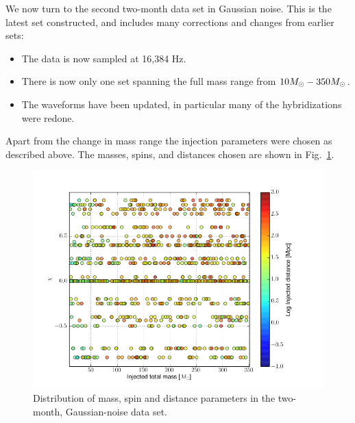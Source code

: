 We now turn to the second two-month data set in Gaussian noise.  This
is the latest set constructed, and includes many corrections and
changes from earlier sets:

\begin{itemize}
\item The data is now sampled at 16,384 Hz.
\item There is now only one set spanning the full mass range from $10
M_\odot - 350 M_\odot$.
\item The waveforms have been updated, in particular many of the
hybridizations were redone.
\end{itemize}
%
Apart from the change in mass range the injection parameters were
chosen as described above.  The masses, spins, and distances chosen
are shown in Fig.~\ref{f:ninja2_dataset}.

\begin{figure}
  \includegraphics[width=\linewidth]{figures/ninja2_results/ninja2_dataset}
  \caption[Parameters of the NINJA-2 two-month data set]{
  \label{f:ninja2_dataset}
Distribution of mass, spin and distance parameters in the two-month,
Gaussian-noise data set.
}
\end{figure}%


